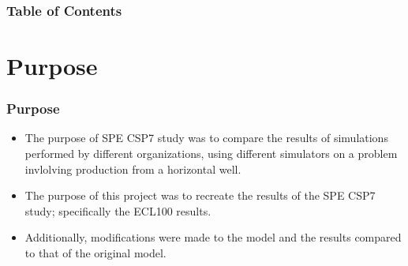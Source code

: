 \documentclass{beamer}
\begin{document}
 
\frame{\titlepage}

\begin{frame}
    \frametitle{Table of Contents}
    \tableofcontents
\end{frame}
 
\section{Purpose}
\begin{frame}
    \frametitle{Purpose}
    \begin{itemize}
        \item The purpose of SPE CSP7 study was to compare the results of simulations performed by different organizations, using different simulators on a problem invlolving production from a horizontal well.
        \item The purpose of this project was to recreate the results of the SPE CSP7 study; specifically the ECL100 results.
        \item Additionally, modifications were made to the model and the results compared to that of the original model.
    \end{itemize}
\end{frame}


\end{document}
